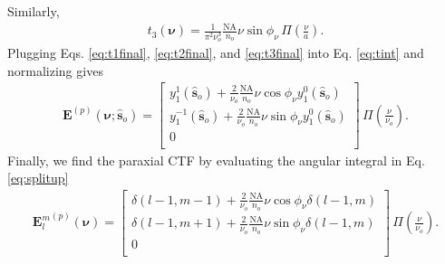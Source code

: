\documentclass[11pt]{article}
\providecommand{\mb}[1]{\mathbf{#1}}
\providecommand{\so}[1]{\mathbf{\hat{s}}_o}
\providecommand{\bs}[1]{\boldsymbol{#1}}
\begin{document}
Similarly, 
\begin{align}
  t_3(\bs{\nu}) =
    \frac{1}{\pi^2 \nu_o^3}\frac{\text{NA}}{n_o}\nu\sin\phi_{\nu}\, \Pi\left(\frac{\nu}{a}\right)\label{eq:t3final}.
\end{align}
Plugging Eqs. \ref{eq:t1final}, \ref{eq:t2final}, and \ref{eq:t3final} into Eq.
\ref{eq:tint} and normalizing gives
\begin{align}
  {\mb{E}}^{(p)}(\bs{\nu}; \so{}) =
\begin{bmatrix}
  y_1^1(\so{}) + \frac{2}{\nu_o}\frac{\text{NA}}{n_o}\nu\cos\phi_\nu y_1^0(\so{})\\
  y_1^{-1}(\so{}) + \frac{2}{\nu_o}\frac{\text{NA}}{n_o}\nu\sin\phi_\nu y_1^0(\so{})\\
  0\\
  \end{bmatrix}\, \Pi\left(\frac{\nu}{\nu_o}\right). \label{eq:paractfsp}
\end{align}
Finally, we find the paraxial CTF by evaluating the angular integral in Eq.
\ref{eq:splitup} 
\begin{align}
  {\mb{E}_l^m}^{(p)}(\bs{\nu}) =
\begin{bmatrix}
  \delta(l-1, m-1) + \frac{2}{\nu_o}\frac{\text{NA}}{n_o}\nu\cos\phi_\nu\delta(l-1, m)\\
  \delta(l-1, m+1) + \frac{2}{\nu_o}\frac{\text{NA}}{n_o}\nu\sin\phi_\nu\delta(l-1, m)\\
  0\\
  \end{bmatrix}\, \Pi\left(\frac{\nu}{\nu_o}\right).
\end{align}
\end{document}
